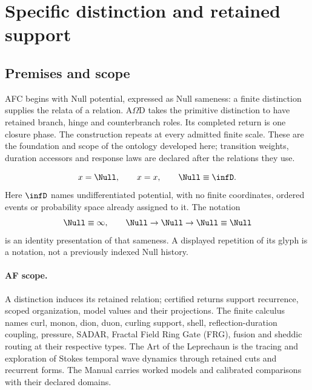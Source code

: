 \section{Specific distinction and retained support}
\label{sec:specific-distinction}
\label{sec:introduction}
\label{sec:afc-basis}

\subsection{Premises and scope}
\label{subsec:intro-aim-stance}
\label{subsec:intro-scope}
\label{subsec:afc-null-potential}
AFC begins with Null potential, expressed as Null sameness: a finite distinction supplies the relata of a
relation. A\(\Omega\)D takes the primitive distinction to have retained
branch, hinge and counterbranch roles. Its completed return is one closure
phase. The construction repeats at every admitted finite scale. These are
the foundation and scope of the ontology developed here; transition weights,
duration accessors and response laws are declared after the relations they use.

\label{subsec:null-presentation}
\begin{equation}
x=\Null,\qquad x=x,\qquad \Null\equiv\infD.
\label{eq:null-axiom}
\end{equation}
Here \(\infD\) names undifferentiated potential, with no finite coordinates,
ordered events or probability space already assigned to it. The notation
\begin{equation}
\Null\equiv\infty,\qquad \Null\to\Null\to\Null\equiv\Null
\label{eq:null-presentation}
\end{equation}
is an identity presentation of that sameness. A displayed repetition of its
glyph is a notation, not a previously indexed Null history.

\paragraph{AF scope.}
\label{subsec:intro-use}
A distinction induces its retained relation; certified returns support
recurrence, scoped organization, model values and their projections.
The finite calculus names curl, monon, dion, duon, curling support, shell,
reflection-duration coupling, pressure, SADAR, Fractal Field Ring Gate (FRG), fusion and sheddic routing at
their respective types. The Art of the Leprechaun is the tracing and exploration of Stokes temporal wave dynamics through retained cuts and recurrent forms. The Manual carries worked
models and calibrated comparisons with their declared domains.

